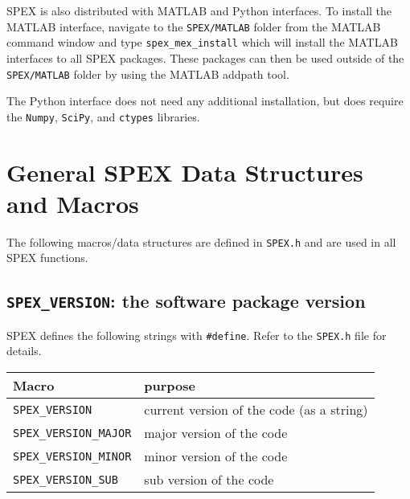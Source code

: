 \documentclass[12pt]{report}
\theoremstyle{definition}
\begin{document}
SPEX is also distributed with MATLAB and Python interfaces. To install the MATLAB interface,
navigate to the \verb|SPEX/MATLAB| folder from the MATLAB command window and type
\verb|spex_mex_install| which will install the MATLAB interfaces to all SPEX packages.
These packages can then be used outside of the \verb|SPEX/MATLAB| folder by using the 
MATLAB addpath tool.

The Python interface does not need any additional installation, but does require the \texttt{Numpy}, \texttt{SciPy}, and \texttt{ctypes} libraries.

\chapter{General SPEX Data Structures and Macros}

The following macros/data structures are defined in \verb|SPEX.h| and are used in all SPEX functions.

\section{\texttt{SPEX\_VERSION}: the software package version}

SPEX defines the following strings with \verb|#define|. Refer to
the \verb|SPEX.h| file for details.

\begin{center}
\begin{tabular}{ll}
\hline
Macro & purpose \\
\hline
\verb|SPEX_VERSION|       & current version of the code (as a string)\\
\verb|SPEX_VERSION_MAJOR| & major version of the code\\
\verb|SPEX_VERSION_MINOR| & minor version of the code   \\
\verb|SPEX_VERSION_SUB|   & sub version of the code\\
\hline
\end{tabular}
\end{center}

\end{document}
